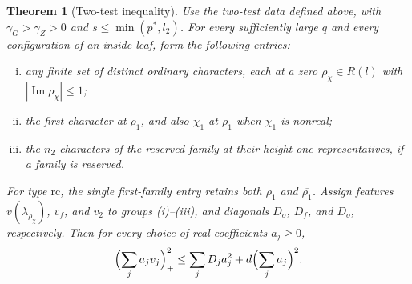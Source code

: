 \documentclass[11pt]{amsart}
\numberwithin{equation}{section}
\theoremstyle{plain}
\newtheorem{theorem}{Theorem}[section]
\theoremstyle{definition}
\theoremstyle{remark}
\renewcommand{\Im}{\operatorname{Im}}
\newcommand{\1}{\mathbf{1}}
\newcommand{\bchi}{\overline{\chi}}
\begin{document}
\begin{theorem}[Two-test inequality]\label{thm:twotest}
Use the two-test data defined above, with $\gamma_G>\gamma_Z>0$ and
$s\le\min(p^*,l_2)$. For every sufficiently large $q$ and every configuration of an
inside leaf, form the following entries:
\begin{enumerate}[(i)]
  \item any finite set of distinct ordinary characters, each at a zero
    $\rho_\chi\in R(l)$ with $|\Im\rho_\chi|\le1$;
  \item the first character at $\rho_1$, and also $\bchi_1$ at $\overline{\rho_1}$ when
    $\chi_1$ is nonreal;
  \item the $n_2$ characters of the reserved family at their height-one representatives,
    if a family is reserved.
\end{enumerate}
For type $\mathrm{rc}$, the single first-family entry retains both $\rho_1$ and
$\overline{\rho_1}$. Assign features $v(\lambda_{\rho_\chi})$, $v_f$, and $v_2$ to
groups (i)--(iii), and diagonals $D_o$, $D_f$, and $D_o$, respectively. Then
for every choice of real coefficients $a_j\ge0$,
\[
  \Bigl(\sum_ja_jv_j\Bigr)_+^2\le\sum_jD_ja_j^2+d\Bigl(\sum_ja_j\Bigr)^2 .
\]
\end{theorem}
\end{document}
